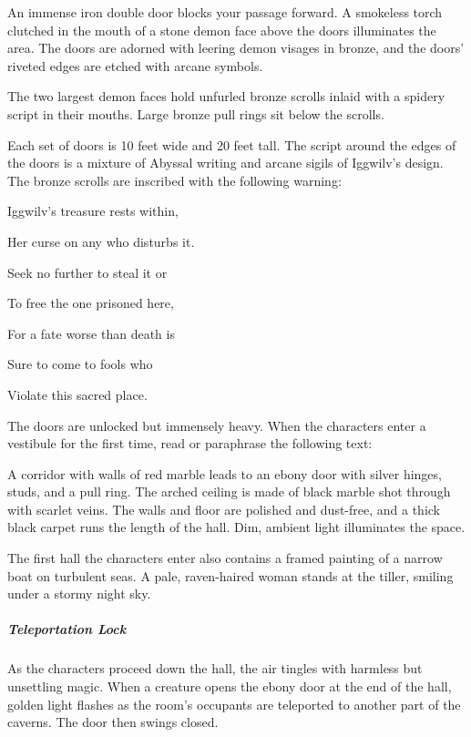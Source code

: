 \documentclass[10pt,a4paper,twoside,bg=print,twocolumn,openany,nodeprecatedcode]{dndbook}
\begin{document}
\begin{DndReadAloud}{}
An immense iron double door blocks your passage forward. A smokeless torch clutched in the mouth of a stone demon face above the doors illuminates the area. The doors are adorned with leering demon visages in bronze, and the doors' riveted edges are etched with arcane symbols.

The two largest demon faces hold unfurled bronze scrolls inlaid with a spidery script in their mouths. Large bronze pull rings sit below the scrolls.

\end{DndReadAloud}

Each set of doors is 10 feet wide and 20 feet tall. The script around the edges of the doors is a mixture of Abyssal writing and arcane sigils of Iggwilv's design. The bronze scrolls are inscribed with the following warning:

\begin{DndReadAloud}{}
Iggwilv's treasure rests within,

Her curse on any who disturbs it.

Seek no further to steal it or

To free the one prisoned here,

For a fate worse than death is

Sure to come to fools who

Violate this sacred place.

\end{DndReadAloud}

The doors are unlocked but immensely heavy. When the characters enter a vestibule for the first time, read or paraphrase the following text:

\begin{DndReadAloud}{}
A corridor with walls of red marble leads to an ebony door with silver hinges, studs, and a pull ring. The arched ceiling is made of black marble shot through with scarlet veins. The walls and floor are polished and dust-free, and a thick black carpet runs the length of the hall. Dim, ambient light illuminates the space.

\end{DndReadAloud}

The first hall the characters enter also contains a framed painting of a narrow boat on turbulent seas. A pale, raven-haired woman stands at the tiller, smiling under a stormy night sky.

\subparagraph{Teleportation Lock}
As the characters proceed down the hall, the air tingles with harmless but unsettling magic. When a creature opens the ebony door at the end of the hall, golden light flashes as the room's occupants are teleported to another part of the caverns. The door then swings closed.
\end{document}
